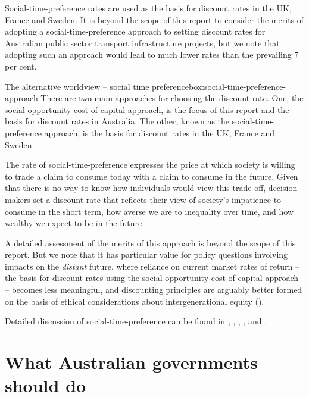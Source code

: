 \documentclass{grattan}
\begin{document}
Social-time-preference rates are used as the basis for discount rates in the UK, France and Sweden. It is beyond the scope of this report to consider the merits of adopting a social-time-preference approach to setting discount rates for Australian public sector transport infrastructure projects, but we note that adopting such an approach would lead to much lower rates than the prevailing 7 per cent. 


\begin{smallbox}{The alternative worldview – social time preference}{box:social-time-preference-approach}
There are two main approaches for choosing the discount rate. One, the social-opportunity-cost-of-capital approach, is the focus of this report and the basis for discount rates in Australia. The other, known as the social-time-preference approach, is the basis for discount rates in the UK, France and Sweden. 

The rate of social-time-preference expresses the price at which society is willing to trade a claim to consume today with a claim to consume in the future. Given that there is no way to know how individuals would view this trade-off, decision makers set a discount rate that reflects their view of society's impatience to consume in the short term, how averse we are to inequality over time, and how wealthy we expect to be in the future. 

A detailed assessment of the merits of this approach is beyond the scope of this report. But we note that it has particular value for policy questions involving impacts on the \emph{distant} future, where reliance on current market rates of return -- the basis for discount rates using the social-opportunity-cost-of-capital approach -- becomes less meaningful, and discounting principles are arguably better formed on the basis of ethical considerations about intergenerational equity (\textcite[][]{Lind-1990-Reassessing-the-governments-discount-rate}). 

Detailed discussion of social-time-preference can be found in \textcite{Boardman-Cost-Benefit-Analysis-4th-Edition}, \textcite{Arrow-et-al-1995-IPCC-note-on-discounting},  \textcite{Nordhaus-1997-discounting-in-economics-and-climate-change}, \textcite{Spackman-2011-the-valuation-of-social-time-preference}, and \textcite{Creedy-2017-discount-rates-NZ-Treasury}.
\end{smallbox}




\chapter{What Australian governments should do}\label{chap:policy-recommendations}
\end{document}
